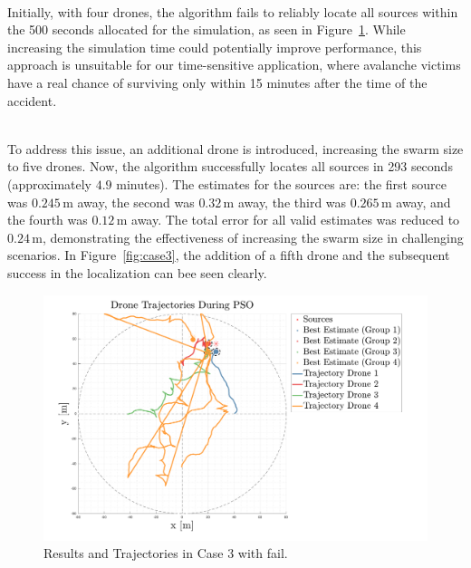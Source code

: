 \noindent\\
Initially, with four drones, the algorithm fails to reliably 
locate all sources within the 500 seconds allocated for the simulation,
as seen in Figure~\ref{fig:case3fail}. 
While increasing the simulation time could potentially improve performance, 
this approach is unsuitable for our time-sensitive application, where
avalanche victims have a real chance of surviving only within 15 minutes
after the time of the accident.

\noindent\\
To address this issue, an additional drone is introduced, increasing the 
swarm size to five drones. Now, the algorithm successfully 
locates all sources in 293 seconds (approximately \(4.9\) minutes). 
The estimates for the sources are: the first source was \(0.245 \, \text{m}\) away, 
the second was \(0.32 \, \text{m}\) away, the third was \(0.265 \, \text{m}\) away, and the 
fourth was \(0.12 \, \text{m}\) away. The total error for all valid estimates was 
reduced to \(0.24 \, \text{m}\), demonstrating the effectiveness of increasing the 
swarm size in challenging scenarios.
In Figure~\ref{fig:case3}, the addition of a fifth drone and the subsequent 
success in the localization can bee seen clearly.

\begin{figure}
    \centering
    \includegraphics[width=1.06\textwidth]{images/case_3_fail.pdf}
    \caption[PSO Case 3]{Results and Trajectories in Case 3 with fail.}
    \label{fig:case3fail}
\end{figure}



